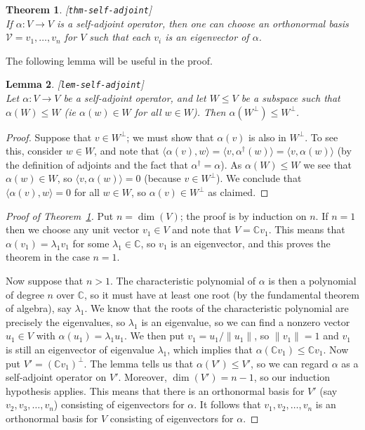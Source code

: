 \documentclass{amsart}
\newcommand{\lbl}[1]{\label{#1}\textup{[\texttt{#1}]}\ \\}
\newcommand{\lbl}{\label}
\newcommand{\C}         {{\mathbb{C}}}
\newcommand{\al}        {\alpha}
\newcommand{\lm}        {\lambda}
\newcommand{\ip}[1]     {\langle #1\rangle}
\newcommand{\CV}        {{\mathcal{V}}}
\renewcommand{\:}       {\colon}
\newtheorem{theorem}{Theorem}[section]
\newtheorem{lemma}[theorem]{Lemma}
\theoremstyle{definition}
\begin{document}
\begin{theorem}\lbl{thm-self-adjoint}
 If $\al\:V\to V$ is a self-adjoint operator, then
 one can choose an orthonormal basis $\CV=v_1,\dotsc,v_n$
 for $V$ such that each $v_i$ is an eigenvector of $\al$.
\end{theorem}

The following lemma will be useful in the proof.
\begin{lemma}\lbl{lem-self-adjoint}
 Let $\al\:V\to V$ be a self-adjoint operator, and let
 $W\leq V$ be a subspace such that $\al(W)\leq W$ (ie
 $\al(w)\in W$ for all $w\in W$).  Then
 $\al(W^\perp)\leq W^\perp$.
\end{lemma}
\begin{proof}
 Suppose that $v\in W^\perp$; we must show that $\al(v)$ is
 also in $W^\perp$.  To see this, consider $w\in W$, and
 note that $\ip{\al(v),w}=\ip{v,\al^\dag(w)}=\ip{v,\al(w)}$
 (by the definition of adjoints and the fact that
 $\al^\dag=\al$).  As $\al(W)\leq W$ we see that $\al(w)\in
 W$, so $\ip{v,\al(w)}=0$ (because $v\in W^\perp$).  We
 conclude that $\ip{\al(v),w}=0$ for all $w\in W$, so
 $\al(v)\in W^\perp$ as claimed.
\end{proof}

\begin{proof}[Proof of Theorem~\ref{thm-self-adjoint}]
 Put $n=\dim(V)$; the proof is by induction on $n$.  If
 $n=1$ then we choose any unit vector $v_1\in V$ and note
 that $V=\C v_1$.  This means that $\al(v_1)=\lm_1v_1$ for
 some $\lm_1\in\C$, so $v_1$ is an eigenvector, and this
 proves the theorem in the case $n=1$.

 Now suppose that $n>1$.  The characteristic polynomial of
 $\al$ is then a polynomial of degree $n$ over $\C$, so it
 must have at least one root (by the fundamental theorem of
 algebra), say $\lm_1$.  We know that the roots of the
 characteristic polynomial are precisely the eigenvalues, so
 $\lm_1$ is an eigenvalue, so we can find a nonzero vector
 $u_1\in V$ with $\al(u_1)=\lm_1u_1$.  We then put
 $v_1=u_1/\|u_1\|$, so $\|v_1\|=1$ and $v_1$ is still an
 eigenvector of eigenvalue $\lm_1$, which implies that
 $\al(\C v_1)\leq\C v_1$.  Now put $V'=(\C v_1)^\perp$.  The
 lemma tells us that $\al(V')\leq V'$, so we can regard $\al$
 as a self-adjoint operator on $V'$.  Moreover,
 $\dim(V')=n-1$, so our induction hypothesis applies.  This
 means that there is an orthonormal basis for $V'$ (say
 $v_2,v_3,\dotsc,v_n$) consisting of eigenvectors for
 $\al$.  It follows that $v_1,v_2,\dotsc,v_n$ is an
 orthonormal basis for $V$ consisting of eigenvectors for
 $\al$. 
\end{proof}
\end{document}
